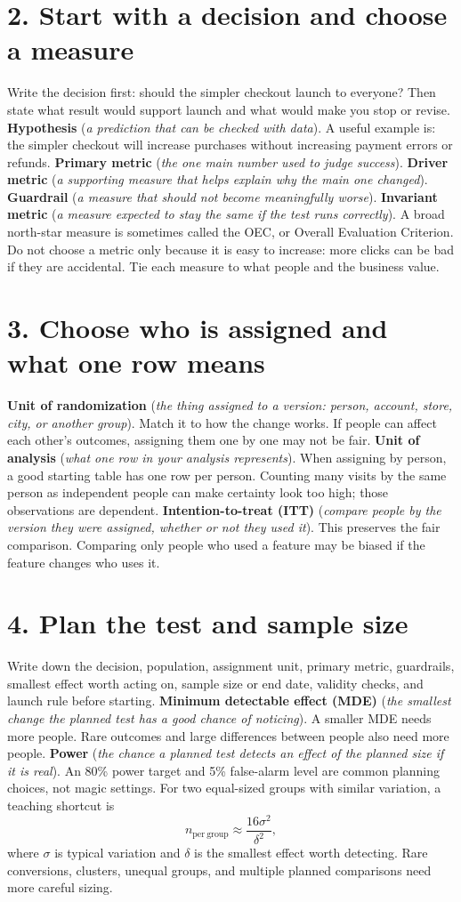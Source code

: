 \documentclass[11pt,a4paper]{article}
\newcommand{\plainterm}[2]{\textbf{#1} (\emph{#2})}
\begin{document}
\section{2. Start with a decision and choose a measure}
Write the decision first: should the simpler checkout launch to everyone? Then state what result would support launch and what would make you stop or revise.
\plainterm{Hypothesis}{a prediction that can be checked with data}. A useful example is: the simpler checkout will increase purchases without increasing payment errors or refunds.
\plainterm{Primary metric}{the one main number used to judge success}. \plainterm{Driver metric}{a supporting measure that helps explain why the main one changed}. \plainterm{Guardrail}{a measure that should not become meaningfully worse}. \plainterm{Invariant metric}{a measure expected to stay the same if the test runs correctly}. A broad north-star measure is sometimes called the OEC, or Overall Evaluation Criterion.
Do not choose a metric only because it is easy to increase: more clicks can be bad if they are accidental. Tie each measure to what people and the business value.

\section{3. Choose who is assigned and what one row means}
\plainterm{Unit of randomization}{the thing assigned to a version: person, account, store, city, or another group}. Match it to how the change works. If people can affect each other's outcomes, assigning them one by one may not be fair.
\plainterm{Unit of analysis}{what one row in your analysis represents}. When assigning by person, a good starting table has one row per person. Counting many visits by the same person as independent people can make certainty look too high; those observations are dependent.
\plainterm{Intention-to-treat (ITT)}{compare people by the version they were assigned, whether or not they used it}. This preserves the fair comparison. Comparing only people who used a feature may be biased if the feature changes who uses it.

\section{4. Plan the test and sample size}
Write down the decision, population, assignment unit, primary metric, guardrails, smallest effect worth acting on, sample size or end date, validity checks, and launch rule before starting.
\plainterm{Minimum detectable effect (MDE)}{the smallest change the planned test has a good chance of noticing}. A smaller MDE needs more people. Rare outcomes and large differences between people also need more people.
\plainterm{Power}{the chance a planned test detects an effect of the planned size if it is real}. An 80\% power target and 5\% false-alarm level are common planning choices, not magic settings.
For two equal-sized groups with similar variation, a teaching shortcut is
\[
n_{\mathrm{per\ group}}\approx\frac{16\sigma^2}{\delta^2},
\]
where $\sigma$ is typical variation and $\delta$ is the smallest effect worth detecting. Rare conversions, clusters, unequal groups, and multiple planned comparisons need more careful sizing.
\end{document}
